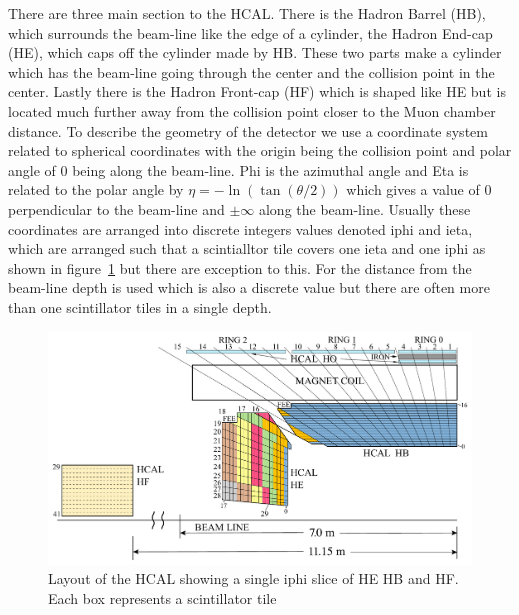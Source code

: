 There are three main section to the HCAL. There is the Hadron Barrel (HB), which surrounds the beam-line like the edge of a cylinder, the Hadron End-cap (HE), which caps off the cylinder made by HB. These two parts make a cylinder which has the beam-line going through the center and the collision point in the center. Lastly there is the Hadron Front-cap (HF) which is shaped like HE but is located much further away from the collision point closer to the Muon chamber distance. To describe the geometry of the detector we use a coordinate system related to spherical coordinates with the origin being the collision point and polar angle of 0 being along the beam-line. Phi is the azimuthal angle and Eta is related to the polar angle by $\eta = -\ln(\tan(\theta/2))$ which gives a value of 0 perpendicular to the beam-line and $\pm\infty$ along the beam-line. Usually these coordinates are arranged into discrete integers values denoted iphi and ieta, which are arranged such that a scintialltor tile covers one ieta and one iphi as shown in figure~\ref{fig:Depth} but there are exception to this. For the distance from the beam-line depth is used which is also a discrete value but there are often more than one scintillator tiles in a single depth. 

\begin{figure}
\centering
\includegraphics[width=\linewidth]{Figures/Depthsegmentation.pdf}
\caption{Layout of the HCAL showing a single iphi slice of HE HB and HF. Each box represents a scintillator tile}
\label{fig:Depth}
\end{figure}


